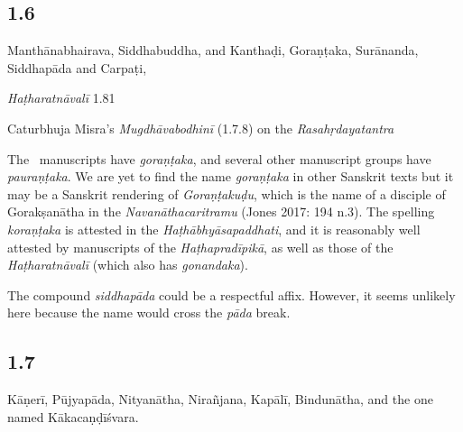 \begin{ekdosis}
\subsection*{1.6}
\begin{translation}[hp01_006]
Manthānabhairava, Siddhabuddha, and Kanthaḍi, Goraṇṭaka, Surānanda, Siddhapāda and Carpaṭi,
\end{translation}

\begin{testimonia}[hp01_006]
\emph{Haṭharatnāvalī} 1.81

\begin{versinnote}
\tl{\var{korandakaḥ ] gonandaka P,T,J,n1,n4}\\!}
\end{versinnote}

Caturbhuja Misra's \emph{Mugdhāvabodhinī} (1.7.8) on the \emph{Rasahṛdayatantra}

\begin{versinnote}
\end{versinnote}

\end{testimonia}

\begin{philcomm}[hp01_006]        
The \textalpha\ manuscripts have \emph{goraṇṭaka}, and several other manuscript groups have \emph{pauraṇṭaka}.  We are yet to find the name \emph{goraṇṭaka} in other Sanskrit texts but it may be a Sanskrit rendering of \emph{Goraṇṭakuḍu}, which is the name of a disciple of Gorakṣanātha in the \emph{Navanāthacaritramu} (Jones 2017: 194 n.3). The spelling \emph{koraṇṭaka} is attested in the \emph{Haṭhābhyāsapaddhati}, and it is reasonably well attested by manuscripts of the \emph{Haṭhapradīpikā}, as well as those of the \emph{Haṭharatnāvalī} (which also has \emph{gonandaka}).

The compound \emph{siddhapāda} could be a respectful affix. However, it seems unlikely here because the name would cross the \emph{pāda} break.  

\end{philcomm}

\subsection*{1.7}
\begin{translation}[hp01_007]
Kāṇerī, Pūjyapāda, Nityanātha, Nirañjana, Kapālī, Bindunātha, and the one named Kākacaṇḍīśvara.
\end{translation}


\end{ekdosis}

